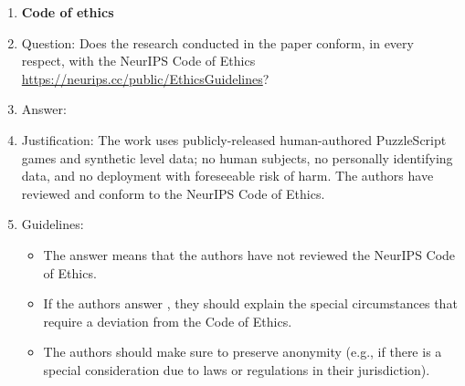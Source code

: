 \begin{enumerate}
\item {\bf Code of ethics}
    \item[] Question: Does the research conducted in the paper conform, in every respect, with the NeurIPS Code of Ethics \url{https://neurips.cc/public/EthicsGuidelines}?
    \item[] Answer: \answerYes{}
    \item[] Justification: The work uses publicly-released human-authored PuzzleScript games and synthetic level data; no human subjects, no personally identifying data, and no deployment with foreseeable risk of harm. The authors have reviewed and conform to the NeurIPS Code of Ethics.
    \item[] Guidelines:
    \begin{itemize}
        \item The answer \answerNA{} means that the authors have not reviewed the NeurIPS Code of Ethics.
        \item If the authors answer \answerNo, they should explain the special circumstances that require a deviation from the Code of Ethics.
        \item The authors should make sure to preserve anonymity (e.g., if there is a special consideration due to laws or regulations in their jurisdiction).
    \end{itemize}



\end{enumerate}
